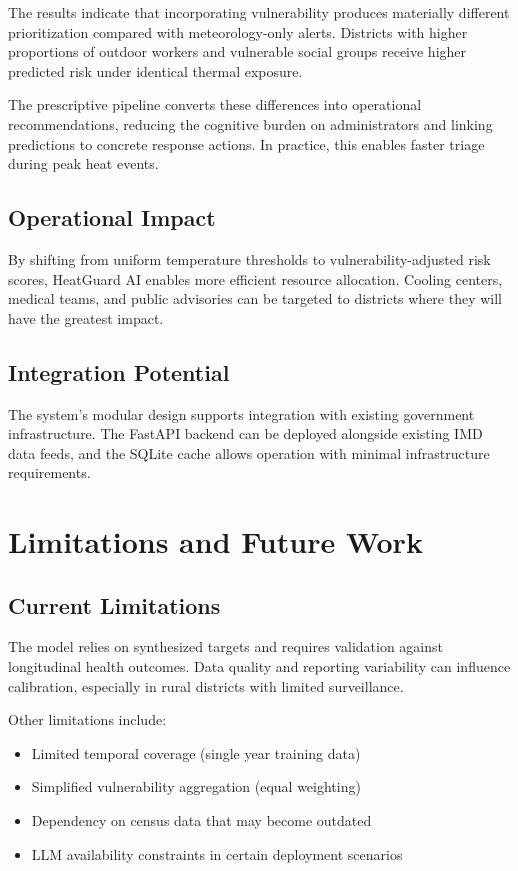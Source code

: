 \documentclass[conference]{IEEEtran}
\begin{document}
The results indicate that incorporating vulnerability produces materially different prioritization compared with meteorology-only alerts. Districts with higher proportions of outdoor workers and vulnerable social groups receive higher predicted risk under identical thermal exposure.

The prescriptive pipeline converts these differences into operational recommendations, reducing the cognitive burden on administrators and linking predictions to concrete response actions. In practice, this enables faster triage during peak heat events.

\subsection{Operational Impact}
By shifting from uniform temperature thresholds to vulnerability-adjusted risk scores, HeatGuard AI enables more efficient resource allocation. Cooling centers, medical teams, and public advisories can be targeted to districts where they will have the greatest impact.

\subsection{Integration Potential}
The system's modular design supports integration with existing government infrastructure. The FastAPI backend can be deployed alongside existing IMD data feeds, and the SQLite cache allows operation with minimal infrastructure requirements.

\section{Limitations and Future Work}
\label{sec:limitations}

\subsection{Current Limitations}
The model relies on synthesized targets and requires validation against longitudinal health outcomes. Data quality and reporting variability can influence calibration, especially in rural districts with limited surveillance.

Other limitations include:
\begin{itemize}
    \item Limited temporal coverage (single year training data)
    \item Simplified vulnerability aggregation (equal weighting)
    \item Dependency on census data that may become outdated
    \item LLM availability constraints in certain deployment scenarios
\end{itemize}
\end{document}
